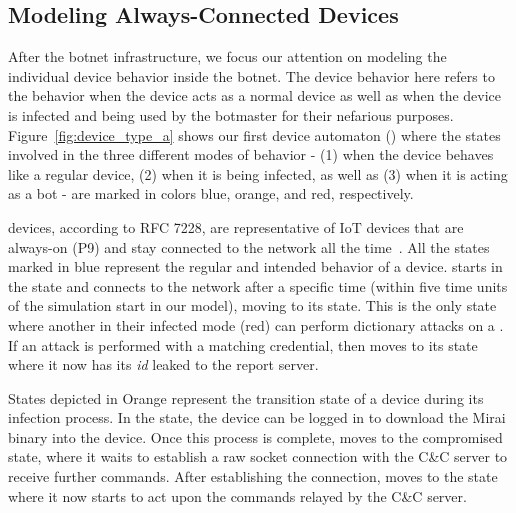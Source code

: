 \subsection{Modeling Always-Connected Devices}
\label{sub:modeling_always_connected_devices}
After the botnet infrastructure, we focus our attention on modeling the individual device behavior inside the botnet. The device behavior here refers to the behavior when the device acts as a normal device as well as when the device is infected and being used by the botmaster for their nefarious purposes. Figure~\ref{fig:device_type_a} shows our first device automaton (\DA) where the states involved in the three different modes of behavior - (1) when the device behaves like a regular device,  (2) when it is being infected, as well as (3) when it is acting as a bot - are marked in colors blue, orange, and red, respectively.
\par
\AC devices, according to RFC 7228, are representative of IoT devices that are always-on (P9) and stay connected to the network all the time~\cite{RFC_7228}. All the states marked in blue represent the regular and intended behavior of a device. \DA starts in the  state and connects to the network after a specific time (within five time units of the simulation start in our model), moving to its  state. This is the only state where another \DA in their infected mode (red) can perform dictionary attacks on a \DA. If an attack is performed with a matching credential, then \DA moves to its  state where it now has its \emph{id} leaked to the report server.
\par
States depicted in Orange represent the transition state of a device during its infection process. In the  state, the device can be logged in to download the Mirai binary into the device. Once this process is complete, \DA moves to the compromised state, where it waits to establish a raw socket connection with the C\&C server to receive further commands. After establishing the connection, \DA moves to the  state where it now starts to act upon the commands relayed by the C\&C server.
